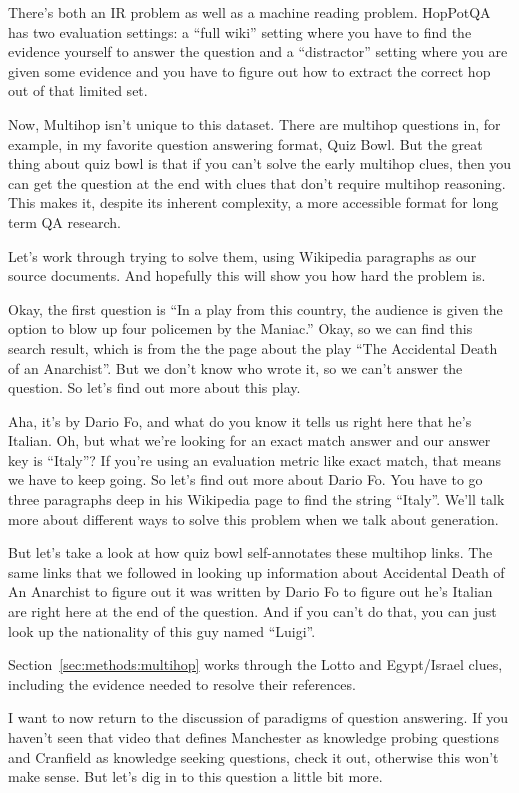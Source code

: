 There’s both an IR problem as well as a machine reading problem.  HopPotQA has two evaluation settings: a “full wiki” setting where you have to find the evidence yourself to answer the question and a “distractor” setting where you are given some evidence and you have to figure out how to extract the correct hop out of that limited set.

Now, Multihop isn’t unique to this dataset.  There are multihop questions in, for example, in my favorite question answering format, Quiz Bowl.  But the great thing about quiz bowl is that if you can’t solve the early multihop clues, then you can get the question at the end with clues that don’t require multihop reasoning.  This makes it, despite its inherent complexity, a more accessible format for long term QA research.

Let’s work through trying to solve them, using Wikipedia paragraphs as our source documents.  And hopefully this will show you how hard the problem is.


Okay, the first question is “In a play from this country, the audience is given the option to blow up four policemen by the Maniac.”  Okay, so we can find this search result, which is from the the page about the play “The Accidental Death of an Anarchist”.  But we don’t know who wrote it, so we can’t answer the question.  So let’s find out more about this play.  

Aha, it’s by Dario Fo, and what do you know it tells us right here that he’s Italian.  Oh, but what we’re looking for an exact match answer and our answer key is “Italy”?  If you’re using an evaluation metric like exact match, that means we have to keep going.  So let’s find out more about Dario Fo.  You have to go three paragraphs deep in his Wikipedia page to find the string “Italy”.  We’ll talk more about different ways to solve this problem when we talk about generation.

But let’s take a look at how quiz bowl self-annotates these multihop links.  The same links that we followed in looking up information about Accidental Death of An Anarchist to figure out it was written by Dario Fo to figure out he’s Italian are right here at the end of the question.  And if you can’t do that, you can just look up the nationality of this guy named “Luigi”.

Section~\ref{sec:methods:multihop} works through the Lotto and Egypt/Israel clues, including the evidence needed to resolve their references.

I want to now return to the discussion of paradigms of question answering.  If you haven’t seen that video that defines Manchester as knowledge probing questions and Cranfield as knowledge seeking questions, check it out, otherwise this won’t make sense.  But let’s dig in to this question a little bit more.

